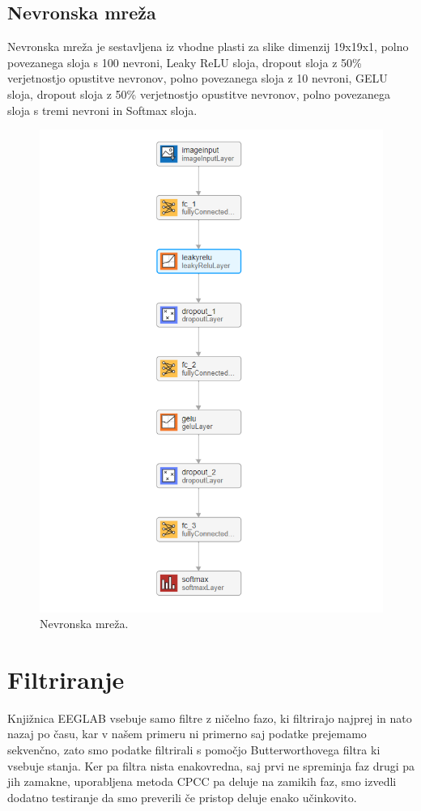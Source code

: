 \subsection{Nevronska mreža}
Nevronska mreža je sestavljena iz vhodne plasti za slike dimenzij 19x19x1, polno povezanega sloja s 100 nevroni, Leaky ReLU sloja, dropout sloja z 50\% verjetnostjo opustitve nevronov, polno povezanega sloja z 10 nevroni, GELU sloja, dropout sloja z 50\% verjetnostjo opustitve nevronov, polno povezanega sloja s tremi nevroni in Softmax sloja.
\begin{figure}[h!]
\begin{center}
\includegraphics[width=0.5\linewidth]{slike/Neural network.png}
\end{center}
\caption{Nevronska mreža.}
\end{figure}

\section{Filtriranje}
Knjižnica EEGLAB vsebuje samo filtre z ničelno fazo, ki filtrirajo najprej in nato nazaj po času, kar v našem primeru ni primerno saj podatke prejemamo sekvenčno, zato smo podatke filtrirali s pomočjo Butterworthovega filtra ki vsebuje stanja. Ker pa filtra nista enakovredna, saj prvi ne spreminja faz drugi pa jih zamakne, uporabljena metoda CPCC pa deluje na zamikih faz, smo izvedli dodatno testiranje da smo preverili če pristop deluje enako učinkovito.

